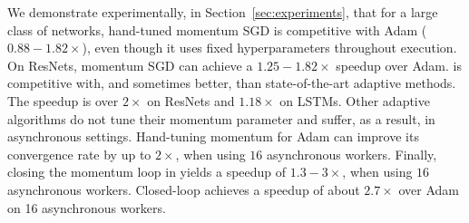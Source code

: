 We demonstrate experimentally, in Section~\ref{sec:experiments}, that
for a large class of networks, hand-tuned momentum SGD is competitive with Adam ($0.88-1.82\times$), even though it uses fixed hyperparameters throughout execution.
On ResNets, momentum SGD can achieve a $1.25-1.82\times$ speedup over Adam.
\tuner is competitive with, and sometimes better, than state-of-the-art adaptive methods. The speedup is over $2\times$ on ResNets and $1.18\times$ on LSTMs.
Other adaptive algorithms do not tune their momentum parameter and suffer, as a result, in asynchronous settings.
Hand-tuning momentum for Adam can improve its convergence rate by up to $2\times$, when using $16$ asynchronous workers. 
Finally, closing the momentum loop in \tuner yields a speedup of $1.3-3\times$, when using $16$ asynchronous workers.
Closed-loop \tuner achieves a speedup of about $2.7\times$ over Adam on 16 asynchronous workers.

